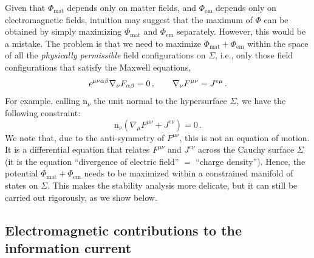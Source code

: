 \documentclass[
a4paper,
amsfonts,
amsmath,
reprint,
showkeys,
nofootinbib,
twoside,
onecolumn,
notitlepage
]{revtex4-1}
\begin{document}
	Given that $\Phi_{\text{mat}}$ depends only on matter fields, and $\Phi_{\text{em}}$ depends only on electromagnetic fields, intuition may suggest that the maximum of $\Phi$ can be obtained by simply maximizing $\Phi_{\text{mat}}$ and $\Phi_{\text{em}}$ separately. 
 However, this would be a mistake. 
	The problem is that we need to maximize $\Phi_{\text{mat}}+\Phi_{\text{em}}$ within the space of all the \textit{physically permissible} field configurations on $\Sigma$, i.e., only those field configurations that satisfy the Maxwell equations,
	\begin{equation}\label{eq:maxwell}
		\epsilon^{\mu\nu\alpha\beta}\nabla_\nu F_{\alpha\beta} = 0\,,
		\qquad
		\nabla_\nu F^{\mu\nu} = J^{e\mu}\,.
	\end{equation}
	For example, calling $\mathrm{n}_\nu$ the unit normal to the hypersurface $\Sigma$, we have the following constraint:  
	\begin{equation}
		\mathrm{n}_\nu (\nabla_\mu F^{\mu \nu}+J^{e\nu})=0 \, .
	\end{equation}
	We note that, due to the anti-symmetry of $F^{\mu \nu}$, this is not an equation of motion. 
	It is a differential equation that relates $F^{\mu \nu}$ and $J^{e\nu}$ across the Cauchy surface $\Sigma$ (it is the equation ``divergence of electric field'' $=$ ``charge density''). 
	Hence, the potential $\Phi_{\text{mat}}+\Phi_{\text{em}}$ needs to be maximized within a constrained manifold of states on $\Sigma$. 
	This makes the stability analysis more delicate, but it can still be carried out rigorously, as we show below. 
	
	\subsection{Electromagnetic contributions to the information current}
	
\end{document}
